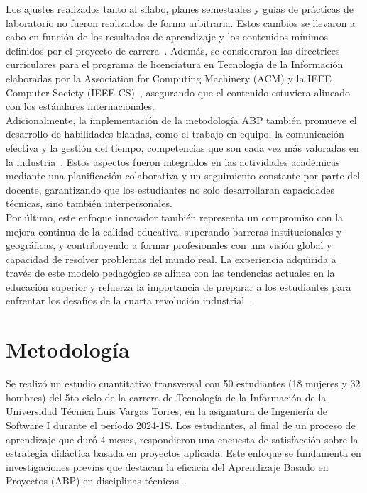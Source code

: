 \documentclass[12pt]{article}
\begin{document}
\begin{multicols}{2}
Los ajustes realizados tanto al sílabo, planes semestrales y guías de prácticas de laboratorio no fueron realizados de forma arbitraria. Estos cambios se llevaron a cabo en función de los resultados de aprendizaje y los contenidos mínimos definidos por el proyecto de carrera~\cite{cesutelvt2017}. Además, se consideraron las directrices curriculares para el programa de licenciatura en Tecnología de la Información elaboradas por la Association for Computing Machinery (ACM) y la IEEE Computer Society (IEEE-CS)~\cite{ITCurricula2017}, asegurando que el contenido estuviera alineado con los estándares internacionales.\\ 
Adicionalmente, la implementación de la metodología ABP también promueve el desarrollo de habilidades blandas, como el trabajo en equipo, la comunicación efectiva y la gestión del tiempo, competencias que son cada vez más valoradas en la industria~\cite{fowler2004uml,salmon2000e}. Estos aspectos fueron integrados en las actividades académicas mediante una planificación colaborativa y un seguimiento constante por parte del docente, garantizando que los estudiantes no solo desarrollaran capacidades técnicas, sino también interpersonales. \\
Por último, este enfoque innovador también representa un compromiso con la mejora continua de la calidad educativa, superando barreras institucionales y geográficas, y contribuyendo a formar profesionales con una visión global y capacidad de resolver problemas del mundo real. La experiencia adquirida a través de este modelo pedagógico se alinea con las tendencias actuales en la educación superior y refuerza la importancia de preparar a los estudiantes para enfrentar los desafíos de la cuarta revolución industrial~\cite{schwab2017fourth}.\\




\section{Metodología}
Se realizó un estudio cuantitativo transversal con 50 estudiantes (18 mujeres y 32 hombres) del 5to ciclo de la carrera de Tecnología de la Información de la Universidad Técnica Luis Vargas Torres, en la asignatura de Ingeniería de Software I durante el período 2024-1S. Los estudiantes, al final de un proceso de aprendizaje que duró 4 meses, respondieron una encuesta de satisfacción sobre la estrategia didáctica basada en proyectos aplicada. Este enfoque se fundamenta en investigaciones previas que destacan la eficacia del Aprendizaje Basado en Proyectos (ABP) en disciplinas técnicas~\cite{smith2019project, prince2004active}.  


\end{multicols}
\end{document}
